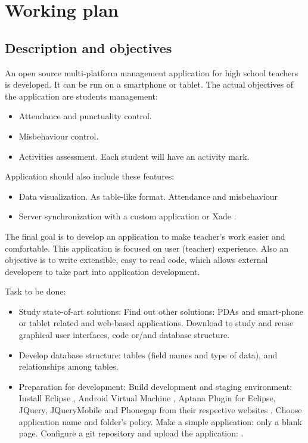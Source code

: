 \chapter{Working plan}
\section{Description and objectives}

	An open source multi-platform management application for high school teachers is developed. It can be run on a smartphone or tablet. 
	The actual objectives of the application are students management:
	\begin{itemize}
	  \item Attendance and punctuality control. 
	  \item Misbehaviour control.
	  \item Activities assessment. Each student will have an activity mark.
	\end{itemize}

	Application should also include these features:
	\begin{itemize}
	  \item Data visualization. As table-like format. Attendance and misbehaviour
	  \item Server synchronization with a custom application or Xade \cite{Xade}.
	\end{itemize}

	The final goal is to develop an application to make teacher's work easier and comfortable. This application is focused on user  (teacher) experience.
	Also an objective is to write extensible, easy to read code, which allows external developers to take part into application development.
	
	Task to be done:
	\begin{itemize}
	  \item Study state-of-art solutions: 
  \subitem  Find out other solutions: PDAs and smart-phone or tablet related and web-based applications.
  \subitem  Download to study and reuse graphical user interfaces, code or/and database structure. 
  \item   Develop database structure: tables (field names and type of data), and relationships among tables. 
  \item   Preparation for development:
\subitem  Build development and staging environment: 
\subsubitem Install Eclipse \cite{Eclipse}, Android Virtual Machine \cite{AndroidDevelopmentKit}, Aptana Plugin for Eclipse, JQuery, JQueryMobile \cite{JQueryMobile} and Phonegap \cite{PhoneGap} from their respective websites \cite{PhoneGapGS}.
\subitem   Choose application name and folder's policy.
\subitem   Make a simple application: only a blank page.
\subitem  Configure a git repository and upload the application: \cite{EduXes}.
	\end{itemize}
	
